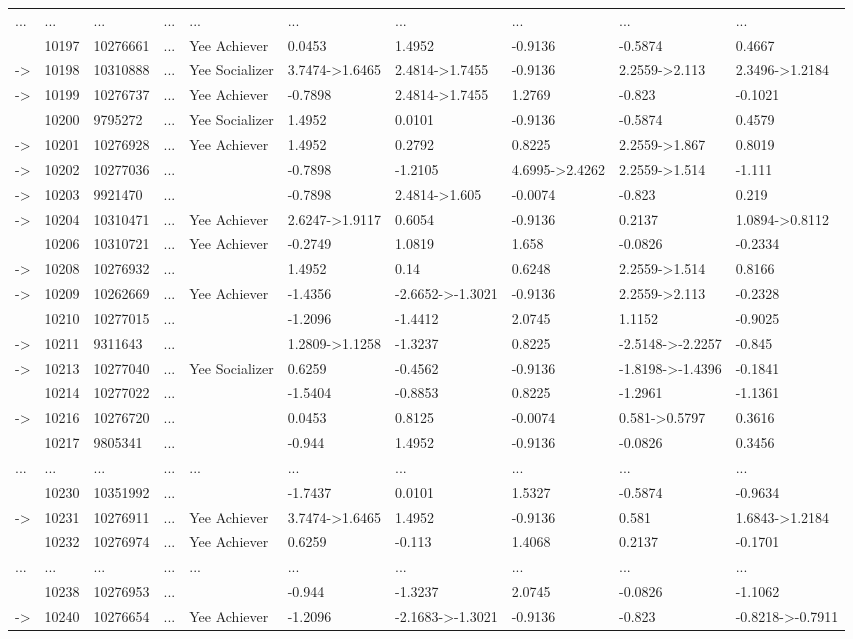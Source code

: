\documentclass[6pt,a4paper]{article}
\begin{document}
{\begin{longtable}{llllllllll}
...&...&...&...&...&...&...&...&...&...\tabularnewline
&10197&10276661&...&Yee Achiever&0.0453&1.4952&-0.9136&-0.5874&0.4667\tabularnewline
-\textgreater &10198&10310888&...&Yee Socializer&3.7474-\textgreater 1.6465&2.4814-\textgreater 1.7455&-0.9136&2.2559-\textgreater 2.113&2.3496-\textgreater 1.2184\tabularnewline
-\textgreater &10199&10276737&...&Yee Achiever&-0.7898&2.4814-\textgreater 1.7455&1.2769&-0.823&-0.1021\tabularnewline
&10200&9795272&...&Yee Socializer&1.4952&0.0101&-0.9136&-0.5874&0.4579\tabularnewline
-\textgreater &10201&10276928&...&Yee Achiever&1.4952&0.2792&0.8225&2.2559-\textgreater 1.867&0.8019\tabularnewline
-\textgreater &10202&10277036&...&&-0.7898&-1.2105&4.6995-\textgreater 2.4262&2.2559-\textgreater 1.514&-1.111\tabularnewline
-\textgreater &10203&9921470&...&&-0.7898&2.4814-\textgreater 1.605&-0.0074&-0.823&0.219\tabularnewline
-\textgreater &10204&10310471&...&Yee Achiever&2.6247-\textgreater 1.9117&0.6054&-0.9136&0.2137&1.0894-\textgreater 0.8112\tabularnewline
&10206&10310721&...&Yee Achiever&-0.2749&1.0819&1.658&-0.0826&-0.2334\tabularnewline
-\textgreater &10208&10276932&...&&1.4952&0.14&0.6248&2.2559-\textgreater 1.514&0.8166\tabularnewline
-\textgreater &10209&10262669&...&Yee Achiever&-1.4356&-2.6652-\textgreater -1.3021&-0.9136&2.2559-\textgreater 2.113&-0.2328\tabularnewline
&10210&10277015&...&&-1.2096&-1.4412&2.0745&1.1152&-0.9025\tabularnewline
-\textgreater &10211&9311643&...&&1.2809-\textgreater 1.1258&-1.3237&0.8225&-2.5148-\textgreater -2.2257&-0.845\tabularnewline
-\textgreater &10213&10277040&...&Yee Socializer&0.6259&-0.4562&-0.9136&-1.8198-\textgreater -1.4396&-0.1841\tabularnewline
&10214&10277022&...&&-1.5404&-0.8853&0.8225&-1.2961&-1.1361\tabularnewline
-\textgreater &10216&10276720&...&&0.0453&0.8125&-0.0074&0.581-\textgreater 0.5797&0.3616\tabularnewline
&10217&9805341&...&&-0.944&1.4952&-0.9136&-0.0826&0.3456\tabularnewline
...&...&...&...&...&...&...&...&...&...\tabularnewline
&10230&10351992&...&&-1.7437&0.0101&1.5327&-0.5874&-0.9634\tabularnewline
-\textgreater &10231&10276911&...&Yee Achiever&3.7474-\textgreater 1.6465&1.4952&-0.9136&0.581&1.6843-\textgreater 1.2184\tabularnewline
&10232&10276974&...&Yee Achiever&0.6259&-0.113&1.4068&0.2137&-0.1701\tabularnewline
...&...&...&...&...&...&...&...&...&...\tabularnewline
&10238&10276953&...&&-0.944&-1.3237&2.0745&-0.0826&-1.1062\tabularnewline
-\textgreater &10240&10276654&...&Yee Achiever&-1.2096&-2.1683-\textgreater -1.3021&-0.9136&-0.823&-0.8218-\textgreater -0.7911\tabularnewline
\hline
\end{longtable}}
\end{document}
